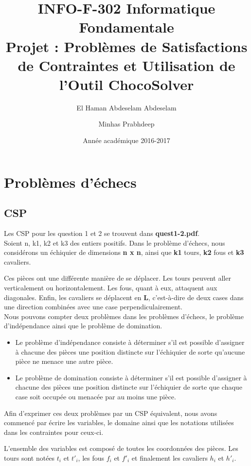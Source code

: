 \documentclass{article}
\title{INFO-F-302 Informatique Fondamentale\\ Projet : Problèmes de Satisfactions de Contraintes et Utilisation de l’Outil ChocoSolver}
\author{El Haman Abdeselam Abdeselam \and Minhas Prabhdeep}
\date{Année académique 2016-2017}
\begin{document}
\maketitle

\section{Problèmes d'échecs}

\subsection{CSP}
Les CSP pour les question 1 et 2 se trouvent dans \textbf{quest1-2.pdf}.\\

Soient n, k1, k2 et k3 des entiers positifs.
Dans le problème d'échecs, nous considérons un échiquier de dimensions \textbf{n x n}, ainsi que \textbf{k1} tours, \textbf{k2} fous et \textbf{k3} cavaliers. 

Ces pièces ont une différente manière de se déplacer. Les tours peuvent aller verticalement ou horizontalement. Les fous, quant à eux, attaquent aux diagonales. Enfin, les cavaliers se déplacent en \textbf{L}, c’est-à-dire de deux cases dans une direction combinées avec une case perpendiculairement. \\

Nous pouvons compter deux problèmes dans les problèmes d'échecs, le problème d'indépendance ainsi que le problème de domination.
\begin{itemize}
\item Le problème d'indépendance consiste à déterminer s'il est possible d'assigner à chacune des pièces une position distincte sur l'échiquier de sorte qu'aucune pièce ne menace une autre pièce.
\item Le problème de domination consiste à déterminer s'il est possible d'assigner à chacune des pièces une position distincte sur l'échiquier de sorte que chaque case soit occupée ou menacée par au moins une pièce. \\
\end{itemize}

Afin d'exprimer ces deux problèmes par un CSP équivalent, nous avons commencé par écrire les variables, le domaine ainsi que les notations utilisées dans les contraintes pour ceux-ci.

L'ensemble des variables est composé de toutes les coordonnées des pièces. Les tours sont notées $t_{i}$ et $t'_{i}$, les fous $f_{i}$ et $f'_{i}$ et finalement les cavaliers $h_{i}$ et $h'_{i}$.
\end{document}
